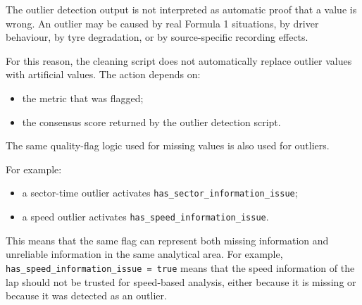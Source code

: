 \documentclass[a4paper,11pt]{article}
\begin{document}
	The outlier detection output is not interpreted as automatic proof that a value is wrong.
	An outlier may be caused by real Formula 1 situations, by driver behaviour, by tyre degradation, or by source-specific recording effects.
	
	For this reason, the cleaning script does not automatically replace outlier values with artificial values.
	The action depends on:
	
	\begin{itemize}[leftmargin=1.2cm]
		\item the metric that was flagged;
		\item the consensus score returned by the outlier detection script.
	\end{itemize}
	
	The same quality-flag logic used for missing values is also used for outliers.

	
	For example:
	
	\begin{itemize}[leftmargin=1.2cm]
		\item a sector-time outlier activates \texttt{has\_sector\_information\_issue};
		\item a speed outlier activates \texttt{has\_speed\_information\_issue}.
	\end{itemize}
	
	This means that the same flag can represent both missing information and unreliable information in the same analytical area.
	For example, \texttt{has\_speed\_information\_issue = true} means that the speed information of the lap should not be trusted for speed-based analysis, either because it is missing or because it was detected as an outlier.
	
\end{document}
